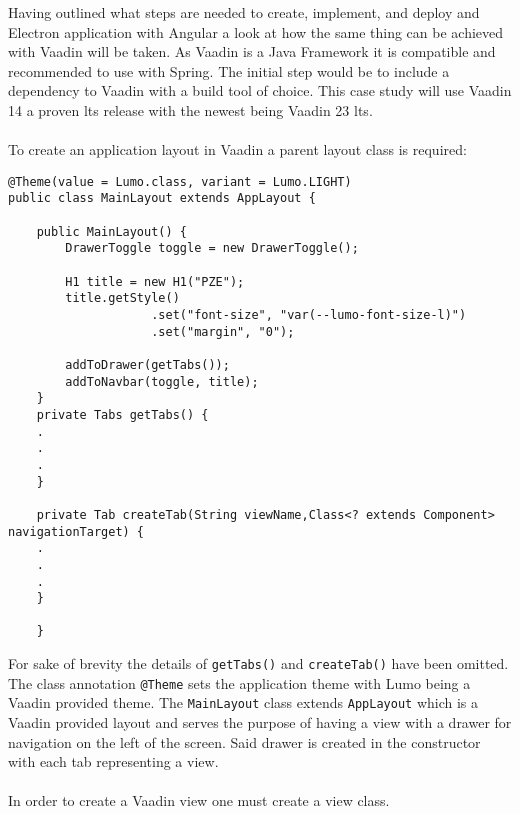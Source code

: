 
Having outlined what steps are needed to create, implement, and deploy and Electron application
with Angular a look at how the same thing can be achieved with Vaadin will be taken.
As Vaadin is a Java Framework it is compatible and recommended to use with Spring. \parencite{vaadinDocs}
The initial step would be to include a dependency to Vaadin with a build tool of choice. 
This case study will use Vaadin 14 a proven \acrfull{lts} release with the newest being Vaadin 23 \acrshort{lts}.\paragraph{}
To create an application layout in Vaadin a parent layout class is required:
\begin{lstlisting}[caption=Creating a MainLayout.java class]
@Theme(value = Lumo.class, variant = Lumo.LIGHT)
public class MainLayout extends AppLayout {
    
    public MainLayout() {
        DrawerToggle toggle = new DrawerToggle();
    
        H1 title = new H1("PZE");
        title.getStyle()
                    .set("font-size", "var(--lumo-font-size-l)")
                    .set("margin", "0");
    
        addToDrawer(getTabs());
        addToNavbar(toggle, title);
    }
    private Tabs getTabs() {
    .
    .
    .
    }
    
    private Tab createTab(String viewName,Class<? extends Component> navigationTarget) {
    .
    .
    .
    }
    
    }
\end{lstlisting}
For sake of brevity the details of \lstinline[columns=fixed]{getTabs()} and \lstinline[columns=fixed]{createTab()} 
have been omitted. 
The class annotation \lstinline[columns=fixed]{@Theme} sets the application theme with Lumo being a Vaadin provided theme.
The \lstinline[columns=fixed]{MainLayout} class extends \lstinline[columns=fixed]{AppLayout} which is a Vaadin provided
layout and serves the purpose of having a view with a drawer for navigation on the left of the screen.  
Said drawer is created in the constructor with each tab representing a view.\paragraph{}
In order to create a Vaadin view one must create a view class. 

